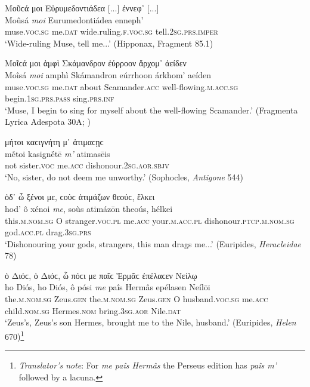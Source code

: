 \begin{exe}
\ex Μοῦϲά μοι Εὐρυμεδοντιάδεα {[}...{]} ἐννεφ᾽ {[}...{]}\\
\gll Moûsá \emph{moi} Eurumedontiádea enneph'\\
muse.\textsc{voc.sg} me.\textsc{dat} wide.ruling.\textsc{f.voc.sg}
tell.\textsc{2sg.prs.imper}\\
\trans `Wide-ruling Muse, tell me...' (Hipponax, Fragment 85.1)
\label{voc1}
\end{exe}

\begin{exe}
\ex Μοῖϲά μοι ἀμφὶ Σκάμανδρον ἐύρροον ἄρχομ᾽ ἀείδεν\\
\gll Moîsá \emph{moi} amphì Skámandron eúrrhoon árkhom' aeíden\\
muse.\textsc{voc.sg} me.\textsc{dat} about Scamander.\textsc{acc} well-flowing.\textsc{m.acc.sg} begin.\textsc{1sg.prs.pass} sing.\textsc{prs.inf}\\
\trans `Muse, I begin to sing for myself about the well-flowing Scamander.' (Fragmenta Lyrica Adespota 30A; \citealp[696]{Bergk1882})
\label{voc2}
\end{exe}

\begin{exe}
\ex μήτοι καϲιγνήτη μ᾽ ἀτιμαϲῃϲ\\
\gll mḗtoi kasignḗtē \emph{m'} atimasēis\\
not sister.\textsc{voc} me.\textsc{acc} dishonour.\textsc{2sg.aor.sbjv}\\
\trans `No, sister, do not deem me unworthy.' (Sophocles, \textit{Antigone} 544)
\label{voc3}
\end{exe}

\begin{exe}
\ex ὁδ᾽ ὦ ξένοι με, ϲοὺϲ ἀτιμάζων θεούϲ, ἕλκει\\
\gll hod' ô xénoi \emph{me}, soùs atimázōn theoús, hélkei\\
this.\textsc{m.nom.sg} O stranger.\textsc{voc.pl} me.\textsc{acc} your.\textsc{m.acc.pl} dishonour.\textsc{ptcp.m.nom.sg} god.\textsc{acc.pl} drag.\textsc{3sg.prs}\\
\trans `Dishonouring your gods, strangers, this man drags me...' (Euripides, \textit{Heracleidae} 78)
\label{voc4}
\end{exe}

\begin{exe}
\ex ὁ Διόϲ, ὁ Διόϲ, ὦ πόϲι με παῖϲ Ἑρμᾶϲ ἐπέλαϲεν Νείλῳ\\
\gll ho Diós, ho Diós, ô pósi \emph{me} paîs Hermâs epélasen Neílōi\\
the.\textsc{m.nom.sg} Zeus.\textsc{gen} the.\textsc{m.nom.sg} Zeus.\textsc{gen} O husband.\textsc{voc.sg} me.\textsc{acc} child.\textsc{nom.sg} Hermes.\textsc{nom} bring.\textsc{3sg.aor} Nile.\textsc{dat}\\
\trans `Zeus's, Zeus's son Hermes, brought me to the Nile, husband.' (Euripides, \textit{Helen} 670)\footnote{\emph{Translator's note}: For \textit{me paîs Hermâs} the Perseus edition has \textit{paîs m'} followed by a lacuna.}
\label{voc5}
\end{exe}

